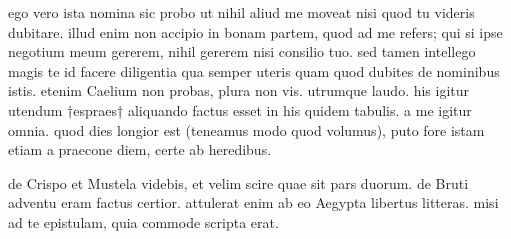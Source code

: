 


 ego vero ista nomina sic probo ut nihil aliud me moveat nisi quod tu videris dubitare. illud enim non accipio in bonam partem, quod ad me refers; qui si ipse negotium meum gererem, nihil gererem nisi consilio tuo. sed tamen intellego magis te id facere diligentia qua semper uteris quam quod dubites de nominibus istis. etenim Caelium non probas, plura non vis. utrumque laudo. his igitur utendum †espraes† aliquando factus esset in his quidem tabulis. a me igitur omnia. quod dies longior est (teneamus modo quod volumus), puto fore istam etiam a praecone diem, certe ab heredibus.

 de Crispo et Mustela videbis, et velim scire quae sit pars duorum. de Bruti adventu eram factus certior. attulerat enim ab eo Aegypta libertus litteras. misi ad te epistulam, quia commode scripta erat.
